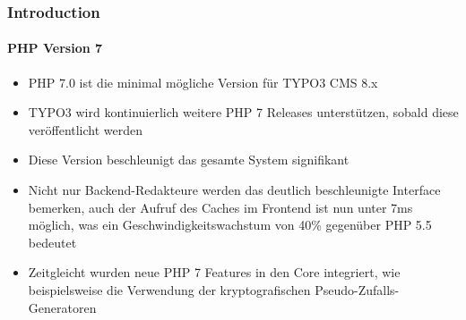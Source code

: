 \begin{frame}[fragile]
	\frametitle{Introduction}
	\framesubtitle{PHP Version 7}

	\begin{itemize}

		\item PHP 7.0 ist die minimal mögliche Version für TYPO3 CMS 8.x
		\item TYPO3 wird kontinuierlich weitere PHP 7 Releases unterstützen, sobald diese veröffentlicht werden
		\item Diese Version beschleunigt das gesamte System signifikant

		\item Nicht nur Backend-Redakteure werden das deutlich beschleunigte Interface bemerken, auch der Aufruf des Caches im Frontend ist nun unter 7ms möglich, was ein Geschwindigkeitswachstum von 40\% gegenüber PHP 5.5 bedeutet

		\item Zeitgleicht wurden neue PHP 7 Features in den Core integriert, wie beispielsweise die Verwendung der kryptografischen Pseudo-Zufalls-Generatoren

	\end{itemize}

\end{frame}

